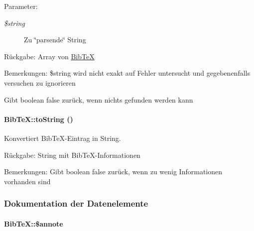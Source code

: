 \begin{Desc}
\item[Parameter:]
\begin{description}
\item[{\em \$string}]Zu \char`\"{}parsende\char`\"{} String \end{description}
\end{Desc}
\begin{Desc}
\item[R\"{u}ckgabe:]Array von \hyperlink{classBibTeX}{Bib\-Te\-X} \end{Desc}
\begin{Desc}
\item[Bemerkungen:]\$string wird nicht exakt auf Fehler untersucht und gegebenenfalls versuchen zu ignorieren 

Gibt boolean false zurück, wenn nichts gefunden werden kann \end{Desc}
\hypertarget{classBibTeX_e656009bd9e0ddf6cf4076d7d76fe94c}{
\paragraph[toString]{\setlength{\rightskip}{0pt plus 5cm}Bib\-Te\-X::to\-String ()}\hfill}
\label{classBibTeX_e656009bd9e0ddf6cf4076d7d76fe94c}


Konvertiert Bib\-Te\-X-Eintrag in String. 

\begin{Desc}
\item[R\"{u}ckgabe:]String mit Bib\-Te\-X-Informationen \end{Desc}
\begin{Desc}
\item[Bemerkungen:]Gibt boolean false zurück, wenn zu wenig Informationen vorhanden sind \end{Desc}


\subsubsection{Dokumentation der Datenelemente}
\hypertarget{classBibTeX_31f87aba6ba9094f59b6231fa7edd70b}{
\paragraph[\$annote]{\setlength{\rightskip}{0pt plus 5cm}Bib\-Te\-X::\$annote}\hfill}
\label{classBibTeX_31f87aba6ba9094f59b6231fa7edd70b}


